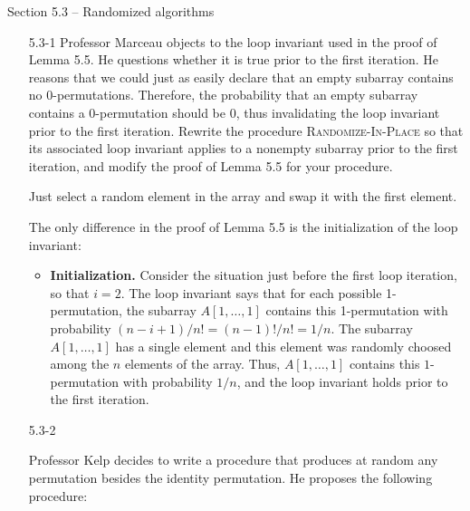 \documentclass{report}
\makeatletter
\renewenvironment{framed}{%
 \def\FrameCommand##1{\hskip\@totalleftmargin
 \fboxsep=\FrameSep\fbox{##1}}%
 \MakeFramed {\advance\hsize-\width
   \@totalleftmargin\z@ \linewidth\hsize
   \@setminipage}}%
 {\par\unskip\endMakeFramed}
\makeatother
\begin{document}
\newpage

{\large Section 5.3 {--} Randomized algorithms}

\begin{enumerate}

\item[5.3{-}1]{Professor Marceau objects to the loop invariant used in the proof
of Lemma 5.5. He questions whether it is true prior to the first iteration. He
reasons that we could just as easily declare that an empty subarray contains
no 0-permutations. Therefore, the probability that an empty subarray
contains a 0-permutation should be 0, thus invalidating the loop invariant
prior to the first iteration. Rewrite the procedure \textsc{Randomize-In-Place}
so that its associated loop invariant applies to a nonempty subarray prior
to the first iteration, and modify the proof of Lemma 5.5 for your procedure.}

\begin{framed}
Just select a random element in the array and swap it with the first element.

\begin{algorithm}[H]
\SetAlgoNoEnd\DontPrintSemicolon
\BlankLine
\end{algorithm}

The only difference in the proof of Lemma 5.5 is the initialization of the loop
invariant:
\begin{itemize}
  \item \textbf{Initialization.} Consider the situation just before the first
    loop iteration, so that $i = 2$. The loop invariant says that for each
    possible 1-permutation, the subarray $A[1, \dots, 1]$ contains this
    1-permutation with probability $(n - i + 1)/n! = (n - 1)!/n! = 1/n$. The
    subarray $A[1, \dots, 1]$ has a single element and this element was
    randomly choosed among the $n$ elements of the array. Thus, $A[1, \dots, 1]$
    contains this $1$-permutation with probability $1/n$, and the loop invariant
    holds prior to the first iteration.
\end{itemize}
\end{framed}

\item[5.3{-}2]{Professor Kelp decides to write a procedure that produces at
random any permutation besides the identity permutation. He proposes the
following procedure:

}
\end{enumerate}
\end{document}
